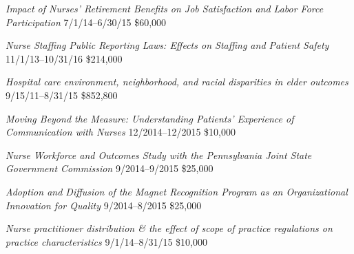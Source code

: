 \documentclass[10pt,]{article}
\begin{document}
{{{{{{{{{{{{{\textit {Impact of Nurses’ Retirement Benefits on Job Satisfaction and Labor Force Participation} \hfill 7/1/14--6/30/15 \newline
{}\hfill \$60,000

\textit {Nurse Staffing Public Reporting Laws: Effects on Staffing and Patient Safety} \hfill 11/1/13--10/31/16 \newline
{}	\hfill \$214,000

\textit {Hospital care environment, neighborhood, and racial disparities in elder outcomes} \hfill 9/15/11--8/31/15 \newline
{}	\hfill \$852,800

\textit {Moving Beyond the Measure: Understanding Patients' Experience of Communication with Nurses} \hfill 12/2014--12/2015 \newline
{}	\hfill \$10,000

\textit {Nurse Workforce and Outcomes Study with the Pennsylvania Joint State Government Commission} \hfill 9/2014--9/2015 \newline
{}	\hfill \$25,000

\textit {Adoption and Diffusion of the  Magnet Recognition Program as an Organizational Innovation for Quality} \hfill 9/2014--8/2015 \newline
{}	\hfill \$25,000

\textit {Nurse practitioner distribution \& the effect of scope of practice regulations on practice characteristics} \hfill 9/1/14--8/31/15 \newline
{}	\hfill \$10,000

}}}}}}}}}}}}}
\end{document}
